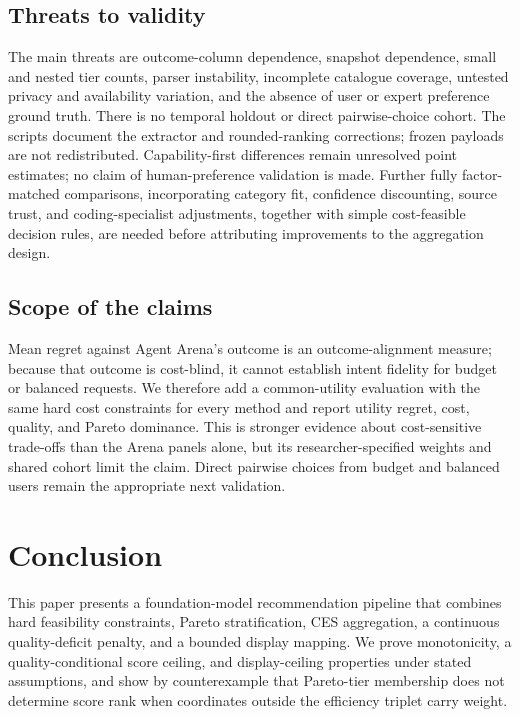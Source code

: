 \documentclass[pdflatex,sn-mathphys-num]{sn-jnl}
\theoremstyle{thmstyleone}
\theoremstyle{thmstylethree}
\begin{document}
\subsection{Threats to validity}\label{subsec:threats}

The main threats are outcome-column dependence, snapshot dependence, small and nested tier counts, parser instability, incomplete catalogue coverage, untested privacy and availability variation, and the absence of user or expert preference ground truth. There is no temporal holdout or direct pairwise-choice cohort. The scripts document the extractor and rounded-ranking corrections; frozen payloads are not redistributed. Capability-first differences remain unresolved point estimates; no claim of human-preference validation is made. Further fully factor-matched comparisons, incorporating category fit, confidence discounting, source trust, and coding-specialist adjustments, together with simple cost-feasible decision rules, are needed before attributing improvements to the aggregation design.

\subsection{Scope of the claims}\label{subsec:claims}

Mean regret against Agent Arena's outcome is an outcome-alignment measure; because that outcome is cost-blind, it cannot establish intent fidelity for budget or balanced requests. We therefore add a common-utility evaluation with the same hard cost constraints for every method and report utility regret, cost, quality, and Pareto dominance. This is stronger evidence about cost-sensitive trade-offs than the Arena panels alone, but its researcher-specified weights and shared cohort limit the claim. Direct pairwise choices from budget and balanced users remain the appropriate next validation.

\section{Conclusion}\label{sec:conclusion}

This paper presents a foundation-model recommendation pipeline that combines hard feasibility constraints, Pareto stratification, CES aggregation, a continuous quality-deficit penalty, and a bounded display mapping. We prove monotonicity, a quality-conditional score ceiling, and display-ceiling properties under stated assumptions, and show by counterexample that Pareto-tier membership does not determine score rank when coordinates outside the efficiency triplet carry weight.
\end{document}
